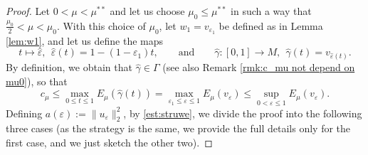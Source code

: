 \documentclass[10pt]{article}
\newcommand{\eps}{\varepsilon}
\theoremstyle{definition}
\numberwithin{equation}{section}
\begin{document}
\begin{proof}
Let $0<\mu<\mu^{**}$ and let us choose $\mu_0\le \mu^{**}$ in such a way that $\frac{\mu_0}{2}
<\mu<\mu_0$. With this choice of $\mu_0$, let $w_1 = v_{\eps_1}$ be defined as in Lemma \ref{lem:w1},
and let us define the maps
\[
t \mapsto \hat\eps,\ \ \hat\eps(t)=1 - (1-\eps_1)t,
\qquad\text{and} \qquad
\hat \gamma : [0,1] \to M,\ \ \hat\gamma(t) = v_{\hat\eps(t)}.
\]
By definition, we obtain that $\hat \gamma \in \Gamma$ (see also Remark \ref{rmk:c_mu not depend on mu0}), so that
\[
 c_{\mu}\leq \max_{0\le t\le 1} E_{\mu}(\hat{\gamma}(t)) = \max_{\eps_1\le \eps\le 1} E_\mu (v_\eps) \le
 \sup_{0<\eps\le1} E_\mu (v_\eps).
\]
Defining $a(\varepsilon):=\|u_{\varepsilon}\|_{2}^{2}$, by \eqref{est:struwe}, we divide the proof
into the following three cases (as the strategy is the same, we provide the full details only for the first case, and we just sketch the other two).


\end{proof}
\end{document}
